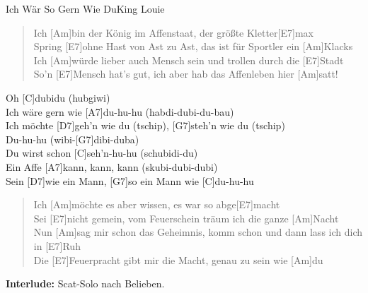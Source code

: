 \begin{song}{Ich Wär So Gern Wie Du}{King Louie}

    \begin{verse}  
        Ich [Am]bin der König im Affenstaat, der größte Kletter[E7]max \\
        Spring [E7]ohne Hast von Ast zu Ast, das ist für Sportler ein [Am]Klacks \\
        Ich [Am]würde lieber auch Mensch sein und trollen durch die [E7]Stadt \\
        So’n [E7]Mensch hat’s gut, ich aber hab das Affenleben hier [Am]satt!
    \end{verse}  

    \begin{chorus}
        [G7]Oh [C]dubidu (hubgiwi)  \\
        Ich wäre gern wie [A7]du-hu-hu (habdi-dubi-du-bau) \\
        Ich möchte [D7]geh'n wie du (tschip), [G7]steh'n wie du (tschip) \\
        [C]Du-hu-hu (wibi-[G7]dibi-duba) \\
        Du wirst schon [C]seh'n-hu-hu (schubidi-du) \\
        Ein Affe [A7]kann, kann, kann (skubi-dubi-dubi) \\
        Sein [D7]wie ein Mann, [G7]so ein Mann wie [C]du-hu-hu \\
    \end{chorus}

    \begin{verse}  
        Ich [Am]möchte es aber wissen, es war so abge[E7]macht \\
        Sei [E7]nicht gemein, vom Feuerschein träum ich die ganze [Am]Nacht \\
        Nun [Am]sag mir schon das Geheimnis, komm schon und dann lass ich dich in [E7]Ruh \\
        Die [E7]Feuerpracht gibt mir die Macht, genau zu sein wie [Am]du 
    \end{verse}  


    \textbf{Interlude:} Scat-Solo nach Belieben. \\


\end{song}
